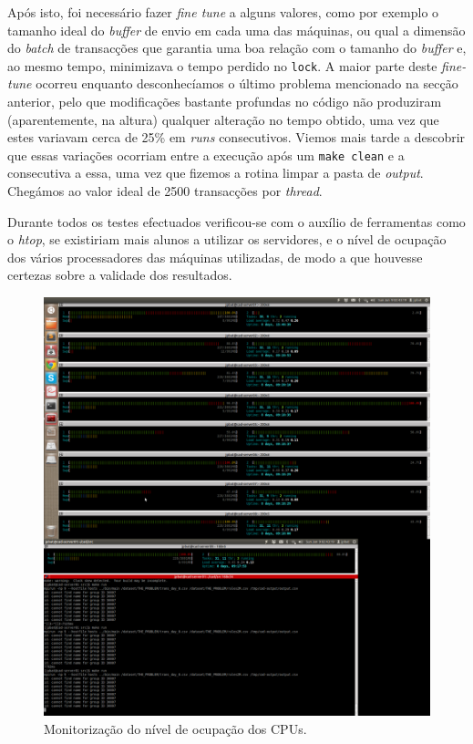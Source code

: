 \documentclass[a4paper]{article}
\begin{document}
Após isto, foi necessário fazer \textit{fine tune} a alguns valores, como por exemplo o tamanho ideal do \textit{buffer} de envio em cada uma das máquinas, ou qual a dimensão do \textit{batch} de transacções que garantia uma boa relação com o tamanho do \textit{buffer} e, ao mesmo tempo, minimizava o tempo perdido no \texttt{lock}. A maior parte deste \textit{fine-tune} ocorreu enquanto desconhecíamos o último problema mencionado na secção anterior, pelo que modificações bastante profundas no código não produziram (aparentemente, na altura) qualquer alteração no tempo obtido, uma vez que estes variavam cerca de 25\% em \textit{runs} consecutivos. Viemos mais tarde a descobrir que essas variações ocorriam entre a execução após um \texttt{make clean} e a consecutiva a essa, uma vez que fizemos a rotina limpar a pasta de \textit{output}. Chegámos ao valor ideal de 2500 transacções por \textit{thread}.

Durante todos os testes efectuados verificou-se com o auxílio de ferramentas como o \textit{htop}, se existiriam mais alunos a utilizar os servidores, e o nível de ocupação dos vários processadores das máquinas utilizadas, de modo a que houvesse certezas sobre a validade dos resultados.
\begin{figure}[h]
	\includegraphics[keepaspectratio=true, width=0.4\textheight]{imgs/ocupacao.png}
	\caption{Monitorização do nível de ocupação dos CPUs.}
\end{figure}
\end{document}
